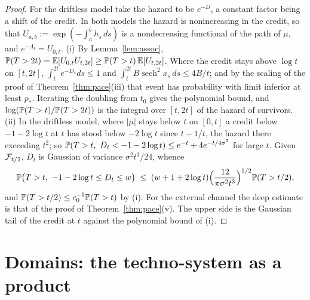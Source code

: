 \begin{proof}
For the driftless model take the hazard to be $e^{-D}$, a constant factor
being a shift of the credit. In both models the hazard is nonincreasing in
the credit, so that $U_{a,b}:=\exp(-\int_a^bh_s\,ds)$ is a nondecreasing
functional of the path of $\mu$, and $e^{-\Lambda_t}=U_{0,t}$. (i) By
Lemma~\ref{lem:assoc},
$\mathbb{P}(T>2t)=\mathbb{E}[U_{0,t}U_{t,2t}]\ge\mathbb{P}(T>t)\,\mathbb{E}[U_{t,2t}]$. Where the credit
stays above $\log t$ on $[t,2t]$, $\int_t^{2t}e^{-D_s}ds\le1$ and
$\int_t^{2t}B\operatorname{sech}^2x_s\,ds\le4B/t$; and by the scaling of
the proof of Theorem~\ref{thm:pace}(iii) that event has probability with
limit inferior at least $p_*$. Iterating the doubling from $t_0$ gives the
polynomial bound, and $\log(\mathbb{P}(T>t)/\mathbb{P}(T>2t))$ is the integral over
$[t,2t]$ of the hazard of survivors. (ii) In the driftless model, where
$|\mu|$ stays below $t$ on $[0,t]$ a credit below $-1-2\log t$ at $t$ has
stood below $-2\log t$ since $t-1/t$, the hazard there exceeding $t^2$; so
$\mathbb{P}(T>t,\ D_t<-1-2\log t)\le e^{-t}+4e^{-t/4\sigma^2}$ for large $t$.
Given $\mathcal{F}_{t/2}$, $D_t$ is Gaussian of variance $\sigma^2t^3/24$, whence
\[
\mathbb{P}\bigl(T>t,\ -1-2\log t\le D_t\le w\bigr)\;\le\;
(w+1+2\log t)\Bigl(\frac{12}{\pi\sigma^2t^3}\Bigr)^{1/2}\mathbb{P}(T>t/2),
\]
and $\mathbb{P}(T>t/2)\le c_0^{-1}\mathbb{P}(T>t)$ by (i). For the external channel the
deep estimate is that of the proof of Theorem~\ref{thm:pace}(v). The upper
side is the Gaussian tail of the credit at $t$ against the polynomial
bound of (i).
\end{proof}


\section{Domains: the techno-system as a product}\label{sec:domains}

